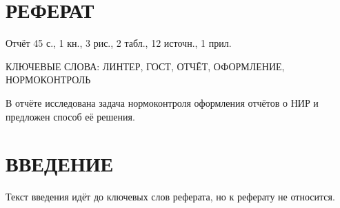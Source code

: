 \section*{РЕФЕРАТ}

Отчёт 45 с., 1 кн., 3 рис.,
2 табл., 12 источн., 1 прил.

КЛЮЧЕВЫЕ СЛОВА: ЛИНТЕР, ГОСТ, ОТЧЁТ, ОФОРМЛЕНИЕ,
НОРМОКОНТРОЛЬ

В отчёте исследована задача нормоконтроля оформления отчётов о НИР
и предложен способ её решения.

\section*{ВВЕДЕНИЕ}

Текст введения идёт до ключевых слов реферата, но к реферату не относится.
